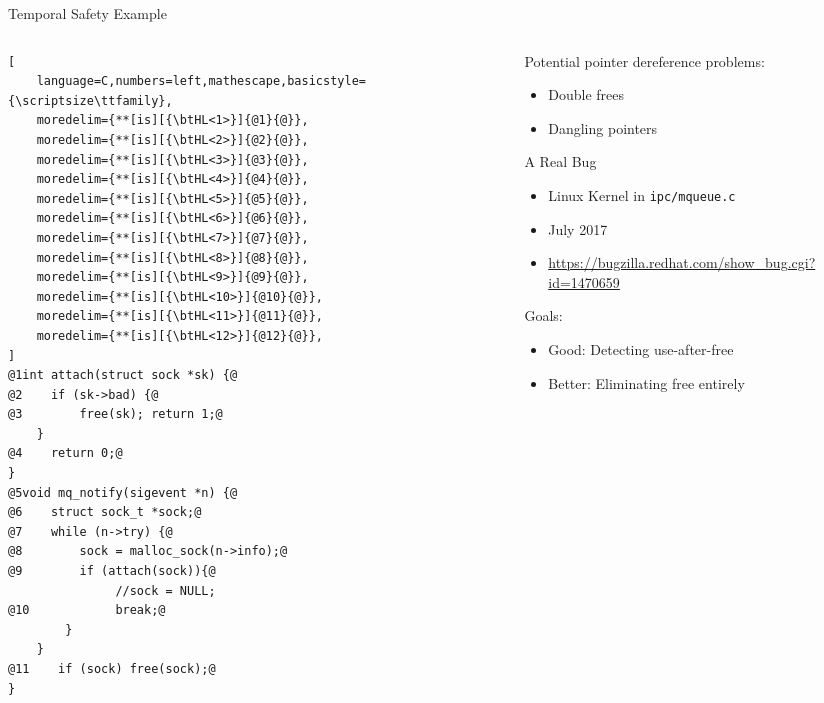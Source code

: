 \documentclass[aspectratio=169]{beamer}
\begin{document}
\begin{frame}[fragile]{Temporal Safety Example}
\begin{columns}[T]
\begin{column}{0.52\textwidth}
\begin{lstlisting}[
    language=C,numbers=left,mathescape,basicstyle={\scriptsize\ttfamily},
    moredelim={**[is][{\btHL<1>}]{@1}{@}},
    moredelim={**[is][{\btHL<2>}]{@2}{@}},
    moredelim={**[is][{\btHL<3>}]{@3}{@}},
    moredelim={**[is][{\btHL<4>}]{@4}{@}},
    moredelim={**[is][{\btHL<5>}]{@5}{@}},
    moredelim={**[is][{\btHL<6>}]{@6}{@}},
    moredelim={**[is][{\btHL<7>}]{@7}{@}},
    moredelim={**[is][{\btHL<8>}]{@8}{@}},
    moredelim={**[is][{\btHL<9>}]{@9}{@}},
    moredelim={**[is][{\btHL<10>}]{@10}{@}},
    moredelim={**[is][{\btHL<11>}]{@11}{@}},
    moredelim={**[is][{\btHL<12>}]{@12}{@}},
]
@1int attach(struct sock *sk) {@
@2    if (sk->bad) {@
@3        free(sk); return 1;@
    }
@4    return 0;@
}
@5void mq_notify(sigevent *n) {@
@6    struct sock_t *sock;@
@7    while (n->try) {@
@8        sock = malloc_sock(n->info);@
@9        if (attach(sock)){@
               //sock = NULL;
@10            break;@
        }
    }
@11    if (sock) free(sock);@
}
\end{lstlisting}
\end{column} 
\begin{column}{0.44\textwidth}

\footnotesize{
Potential pointer dereference problems:
  \begin{itemize}
      \item Double frees
      \item Dangling pointers
  \end{itemize}
\pause

A Real Bug
 \begin{itemize}
    \item Linux Kernel in \texttt{ipc/mqueue.c}
    \item July 2017
    \item \url{https://bugzilla.redhat.com/show_bug.cgi?id=1470659}
  \end{itemize}

\pause

Goals:
\begin{itemize}
    \item Good: Detecting use-after-free
    \item Better: Eliminating free entirely 
\end{itemize}
}
\end{column}
\end{columns}

\end{frame}
\end{document}
